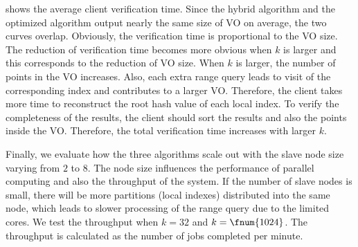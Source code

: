  shows the average client verification time. Since the hybrid algorithm and the optimized algorithm output nearly the same size of VO on average, the two curves overlap. Obviously, the verification time is proportional to the VO size. The reduction of verification time becomes more obvious when $k$ is larger and this corresponds to the reduction of VO size. When $k$ is larger, the number of points in the VO increases. Also, each extra range query leads to visit of the corresponding index and contributes to a larger VO\@. Therefore, the client takes more time to reconstruct the root hash value of each local index. To verify the completeness of the results, the client should sort the results and also the points inside the VO\@. Therefore, the total verification time increases with larger $k$.

Finally, we evaluate how the three algorithms scale out with the slave node size varying from $2$ to $8$. The node size influences the performance of parallel computing and also the throughput of the system. If the number of slave nodes is small, there will be more partitions (local indexes) distributed into the same node, which leads to slower processing of the range query due to the limited cores. We test the throughput when $k=32$ and $k=\fnum{1024}$. The throughput is calculated as the number of jobs completed per minute.

